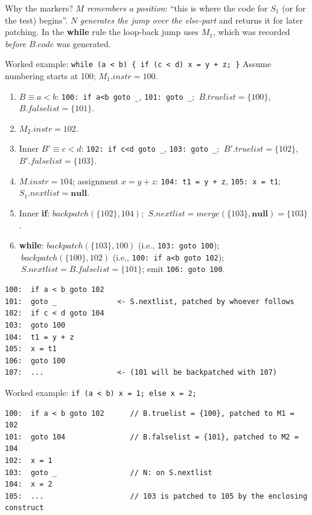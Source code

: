 \documentclass[11pt,a4paper]{article}
\begin{document}
\begin{notebox}{Why the markers?}
$M$ \emph{remembers a position}: ``this is where the code for $S_1$ (or for the test) begins''. $N$ \emph{generates the jump over the else-part} and returns it for later patching. In the \textbf{while} rule the loop-back jump uses $M_1$, which was recorded \emph{before} $B.code$ was generated.
\end{notebox}

\begin{examplebox}{Worked example: \texttt{while (a < b) \{ if (c < d) x = y + z; \}}}
Assume numbering starts at 100; $M_1.instr=100$.

\begin{enumerate}[nosep]
\item $B \equiv a<b$: \texttt{100: if a<b goto \_}, \texttt{101: goto \_}; $\ B.truelist=\{100\}$, $B.falselist=\{101\}$.
\item $M_2.instr = 102$.
\item Inner $B' \equiv c<d$: \texttt{102: if c<d goto \_}, \texttt{103: goto \_}; $\ B'.truelist=\{102\}$, $B'.falselist=\{103\}$.
\item $M.instr = 104$; assignment $x=y+z$: \texttt{104: t1 = y + z}, \texttt{105: x = t1}; $S_1.nextlist=\mathbf{null}$.
\item Inner \textbf{if}: $\mathit{backpatch}(\{102\},104)$; $\ S.nextlist=\mathit{merge}(\{103\},\mathbf{null})=\{103\}$.
\item \textbf{while}: $\mathit{backpatch}(\{103\},100)$ (i.e., \texttt{103: goto 100}); $\ \mathit{backpatch}(\{100\},102)$ (i.e., \texttt{100: if a<b goto 102}); $\ S.nextlist=B.falselist=\{101\}$; emit \texttt{106: goto 100}.
\end{enumerate}
\begin{lstlisting}
100:  if a < b goto 102
101:  goto _              <- S.nextlist, patched by whoever follows
102:  if c < d goto 104
103:  goto 100
104:  t1 = y + z
105:  x = t1
106:  goto 100
107:  ...                 <- (101 will be backpatched with 107)
\end{lstlisting}
\end{examplebox}

\begin{examplebox}{Worked example: \texttt{if (a < b) x = 1; else x = 2;}}
\begin{lstlisting}
100:  if a < b goto 102      // B.truelist = {100}, patched to M1 = 102
101:  goto 104               // B.falselist = {101}, patched to M2 = 104
102:  x = 1
103:  goto _                 // N: on S.nextlist
104:  x = 2
105:  ...                    // 103 is patched to 105 by the enclosing construct
\end{lstlisting}
\end{examplebox}
\end{document}
